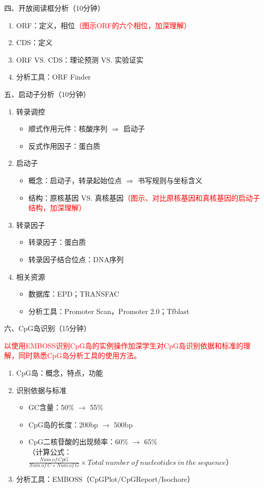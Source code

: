 \documentclass{TIJMUjiaoanLL}
\begin{document}
\noindent
四、开放阅读框分析（10分钟）
\begin{enumerate}
	\item ORF：定义，相位\textcolor{red}{（图示ORF的六个相位，加深理解）}
	\item CDS：定义
	\item ORF VS. CDS：理论预测 VS. 实验证实
	\item 分析工具：ORF Finder
\end{enumerate}

\otherTail
\newpage

\noindent
五、启动子分析（10分钟）
\begin{enumerate}
	\item 转录调控
	  \begin{itemize}
	    \item 顺式作用元件：核酸序列 $\Rightarrow$ 启动子
	    \item 反式作用因子：蛋白质
	  \end{itemize}
	\item 启动子
	  \begin{itemize}
	    \item 概念：启动子，转录起始位点 $\Rightarrow$ 书写规则与坐标含义
	    \item 结构：原核基因 VS. 真核基因\textcolor{red}{（图示、对比原核基因和真核基因的启动子结构，加深理解）}
	  \end{itemize}
	\item 转录因子
	  \begin{itemize}
	    \item 转录因子：蛋白质
	    \item 转录因子结合位点：DNA序列
	  \end{itemize}
	\item 相关资源
	  \begin{itemize}
	    \item 数据库：EPD；TRANSFAC
	    \item 分析工具：Promoter Scan，Promoter 2.0；Tfblast
	  \end{itemize}
\end{enumerate}

\noindent
六、CpG岛识别（15分钟）

\textcolor{red}{以使用EMBOSS识别CpG岛的实例操作加深学生对CpG岛识别依据和标准的理解，同时熟悉CpG岛分析工具的使用方法。}
\begin{enumerate}
  \item CpG岛：概念，特点，功能
  \item 识别依据与标准
    \begin{itemize}
      \item GC含量：50\% $\rightarrow$ 55\%
      \item CpG岛的长度：200bp $\rightarrow$ 500bp
      \item CpG二核苷酸的出现频率：60\% $\rightarrow$ 65\%\\
	（计算公式：$\frac{Num\ of\ CpG}{Num\ of\ C \times Num\ of\ G} \times Total\ number\ of\ nucleotides\ in\ the\ sequence$）
    \end{itemize}
  \item 分析工具：EMBOSS（CpGPlot/CpGReport/Isochore）
\end{enumerate}
\end{document}
